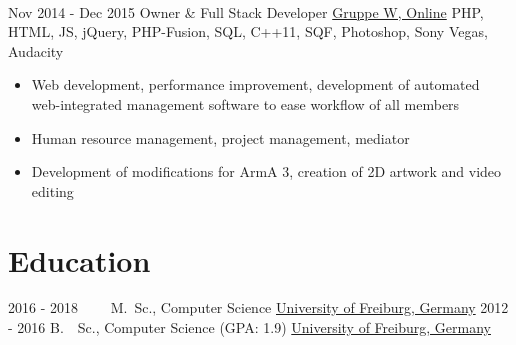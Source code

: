 \documentclass[letterpaper]{twentysecondcv} %
\begin{document}
\begin{twenty}
{\begin{itemize}
\begin{itemize}
        			\end{itemize}
        		\end{itemize}}\\
	\twentyitem
    		{Nov 2014 -}
		{Dec 2015}
        		{Owner \& Full Stack Developer}
        		{\href{https://www.gruppe-w.de/}{Gruppe W, Online}}
        		{PHP, HTML, JS, jQuery, PHP-Fusion, SQL, C++11, SQF, Photoshop, Sony Vegas, Audacity}
        		{\begin{itemize}
        			\item Web development, performance improvement, development of automated web-integrated
        				management software to ease workflow of all members
			\item Human resource management, project management, mediator
        			\item Development of modifications for ArmA 3, creation of 2D artwork and video editing
        		\end{itemize}}
\end{twenty}

\vspace{6mm}

\section{Education}

\begin{twenty} %
	\twentyitem
    	{2016 - 2018~~~~}
        {}
        {M.~Sc., Computer Science}
        {\href{https://www.uni-freiburg.de/}{University of Freiburg, Germany}}
        {}
        {}
	\twentyitem
    	{2012 - 2016}
		{}
        {B.~~Sc., Computer Science \textnormal{(GPA: 1.9)}}
        {\href{https://www.uni-freiburg.de/}{University of Freiburg, Germany}}
        {}
        {}
\end{twenty}

\newpage

\makesidebarSecond %

\end{document}
